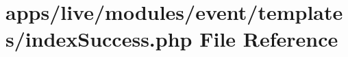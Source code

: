 \hypertarget{live_2modules_2event_2templates_2index_success_8php}{\section{apps/live/modules/event/templates/index\-Success.php File Reference}
\label{live_2modules_2event_2templates_2index_success_8php}
}
